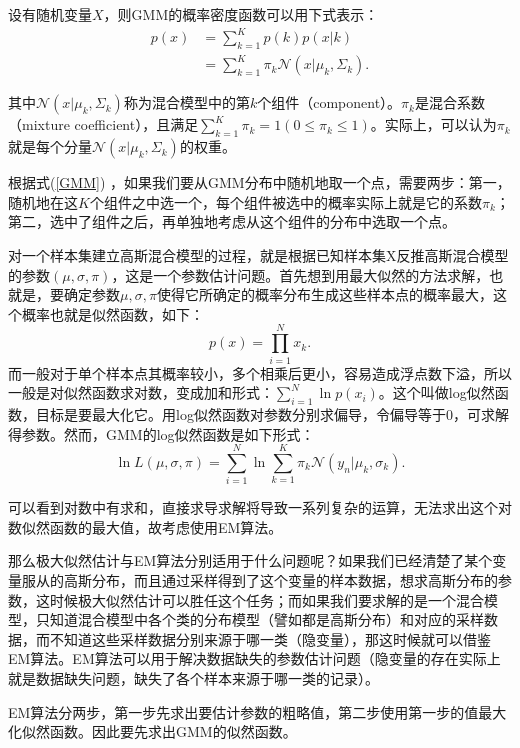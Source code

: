 \documentclass[UTF8]{ctexart}
\begin{document}
设有随机变量$X$，则GMM的概率密度函数可以用下式表示：
\begin{equation}\label{GMM}
  \begin{split}
    p(x) &= \sum_{k=1}^{K}p(k)p(x|k)\\
    &= \sum_{k=1}^{K}\pi_k\mathcal{N}(x|\mu_k, \Sigma_k).
  \end{split}
\end{equation}

其中$\mathcal{N}(x|\mu_k, \Sigma_k)$称为混合模型中的第$k$个组件（component）。$\pi_k$是混合系数（mixture coefficient），且满足$\sum_{k=1}^K\pi_k = 1(0\le\pi_k\le1)$。实际上，可以认为$\pi_k$就是每个分量$\mathcal{N}(x|\mu_k, \Sigma_k)$的权重。

根据式(\ref{GMM}) ，如果我们要从GMM分布中随机地取一个点，需要两步：第一，随机地在这$K$个组件之中选一个，每个组件被选中的概率实际上就是它的系数$\pi_k$；第二，选中了组件之后，再单独地考虑从这个组件的分布中选取一个点。

对一个样本集建立高斯混合模型的过程，就是根据已知样本集X反推高斯混合模型的参数$(\mu,\sigma,\pi)$，这是一个参数估计问题。首先想到用最大似然的方法求解，也就是，要确定参数$\mu,\sigma,\pi$使得它所确定的概率分布生成这些样本点的概率最大，这个概率也就是似然函数，如下：
\begin{equation}
  p(x) = \prod_{i=1}^{N}x_k.
\end{equation}
而一般对于单个样本点其概率较小，多个相乘后更小，容易造成浮点数下溢，所以一般是对似然函数求对数，变成加和形式：$\sum_{i=1}^{N}\ln p(x_i)$。这个叫做log似然函数，目标是要最大化它。用log似然函数对参数分别求偏导，令偏导等于0，可求解得参数。然而，GMM的log似然函数是如下形式：
\begin{equation}
  \ln L(\mu,\sigma,\pi) = \sum_{i=1}^{N}\ln\sum_{k=1}^{K}\pi_k\mathcal{N}(y_n|\mu_k,\sigma_k).
\end{equation}

可以看到对数中有求和，直接求导求解将导致一系列复杂的运算，无法求出这个对数似然函数的最大值，故考虑使用EM算法。

那么极大似然估计与EM算法分别适用于什么问题呢？如果我们已经清楚了某个变量服从的高斯分布，而且通过采样得到了这个变量的样本数据，想求高斯分布的参数，这时候极大似然估计可以胜任这个任务；而如果我们要求解的是一个混合模型，只知道混合模型中各个类的分布模型（譬如都是高斯分布）和对应的采样数据，而不知道这些采样数据分别来源于哪一类（隐变量），那这时候就可以借鉴EM算法。EM算法可以用于解决数据缺失的参数估计问题（隐变量的存在实际上就是数据缺失问题，缺失了各个样本来源于哪一类的记录）。

EM算法分两步，第一步先求出要估计参数的粗略值，第二步使用第一步的值最大化似然函数。因此要先求出GMM的似然函数。
\end{document}
